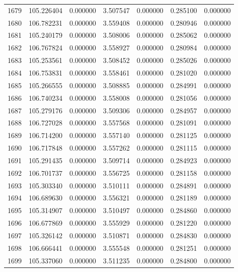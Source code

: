 \begin{tabular}{rrrrrrr}
1679 & 105.226404 &    0.000000 &  3.507547 &    0.000000 &    0.285100 &  0.000000 \\
1680 & 106.782231 &    0.000000 &  3.559408 &    0.000000 &    0.280946 &  0.000000 \\
1681 & 105.240179 &    0.000000 &  3.508006 &    0.000000 &    0.285062 &  0.000000 \\
1682 & 106.767824 &    0.000000 &  3.558927 &    0.000000 &    0.280984 &  0.000000 \\
1683 & 105.253561 &    0.000000 &  3.508452 &    0.000000 &    0.285026 &  0.000000 \\
1684 & 106.753831 &    0.000000 &  3.558461 &    0.000000 &    0.281020 &  0.000000 \\
1685 & 105.266555 &    0.000000 &  3.508885 &    0.000000 &    0.284991 &  0.000000 \\
1686 & 106.740234 &    0.000000 &  3.558008 &    0.000000 &    0.281056 &  0.000000 \\
1687 & 105.279176 &    0.000000 &  3.509306 &    0.000000 &    0.284957 &  0.000000 \\
1688 & 106.727028 &    0.000000 &  3.557568 &    0.000000 &    0.281091 &  0.000000 \\
1689 & 106.714200 &    0.000000 &  3.557140 &    0.000000 &    0.281125 &  0.000000 \\
1690 & 106.717848 &    0.000000 &  3.557262 &    0.000000 &    0.281115 &  0.000000 \\
1691 & 105.291435 &    0.000000 &  3.509714 &    0.000000 &    0.284923 &  0.000000 \\
1692 & 106.701737 &    0.000000 &  3.556725 &    0.000000 &    0.281158 &  0.000000 \\
1693 & 105.303340 &    0.000000 &  3.510111 &    0.000000 &    0.284891 &  0.000000 \\
1694 & 106.689630 &    0.000000 &  3.556321 &    0.000000 &    0.281189 &  0.000000 \\
1695 & 105.314907 &    0.000000 &  3.510497 &    0.000000 &    0.284860 &  0.000000 \\
1696 & 106.677869 &    0.000000 &  3.555929 &    0.000000 &    0.281220 &  0.000000 \\
1697 & 105.326142 &    0.000000 &  3.510871 &    0.000000 &    0.284830 &  0.000000 \\
1698 & 106.666441 &    0.000000 &  3.555548 &    0.000000 &    0.281251 &  0.000000 \\
1699 & 105.337060 &    0.000000 &  3.511235 &    0.000000 &    0.284800 &  0.000000 \\

\end{tabular}
